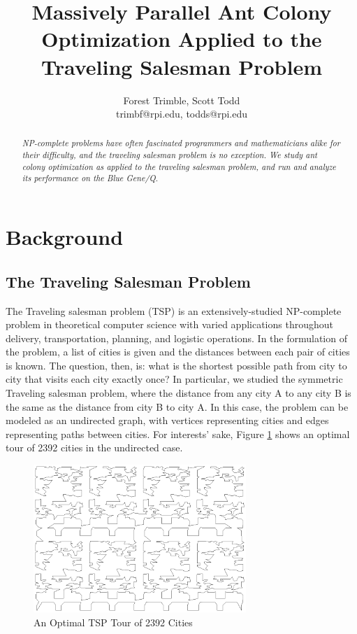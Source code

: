 \documentclass[twocolumn]{article}
\title{Massively Parallel Ant Colony Optimization Applied to the Traveling Salesman Problem}
\author{Forest Trimble, Scott Todd\\trimbf@rpi.edu, todds@rpi.edu}
\begin{document}
\maketitle

\pagestyle{fancy}
\fancyhead{}
\fancyhead[R]{\today}


\begin{abstract}
  \emph{NP-complete problems have often fascinated programmers and mathematicians alike
  for their difficulty, and the traveling salesman problem is no exception. We 
  study ant colony optimization as applied to the traveling salesman problem, 
  and run and analyze its performance on the Blue Gene/Q. }
\end{abstract}

\section{Background}

\subsection{The Traveling Salesman Problem}

The Traveling salesman problem (TSP) is an extensively-studied NP-complete problem 
in theoretical computer science with varied applications throughout delivery, 
transportation, planning, and logistic operations. In the formulation of the 
problem, a list of cities is given and the distances between each pair of cities
is known. The question, then, is: what is the shortest possible path from city to
city that visits each city exactly once? In particular, we studied the symmetric
Traveling salesman problem, where the distance from any city A to any city B
is the same as the distance from city B to city A. In this case, the problem
can be modeled as an undirected graph, with vertices representing cities and
edges representing paths between cities. For interests' sake, Figure \ref{fig:opt2392}
shows an optimal tour of 2392 cities in the undirected case. \\

\begin{figure}
  \centering
  \includegraphics[height=2.2in]{plots/pr2392.eps}
  \caption{An Optimal TSP Tour of 2392 Cities} \label{fig:opt2392}
\end{figure}
\end{document}
